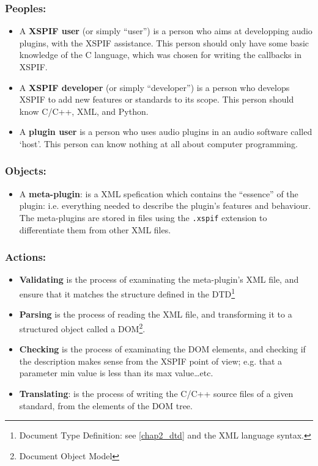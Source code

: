 \subsubsection{Peoples:}
\begin{itemize}
\item{A \textbf{XSPIF user}} (or simply ``user'') is a person who aims
  at developping audio plugins, with the XSPIF assistance. This person
  should only have some basic knowledge of the C language, which was
  chosen for writing the callbacks in XSPIF. 

\item{A \textbf{XSPIF developer}} (or simply ``developer'') is a
  person who develops XSPIF to add new features or standards to its
  scope. This person should know C/C++, XML, and Python. 

\item{A \textbf{plugin user}} is a person who uses audio plugins in an
  audio software called `host'. This person can know nothing at all
  about computer programming. 
\end{itemize}

\subsubsection{Objects:}
\begin{itemize}
\item{A \textbf{meta-plugin}}: is a XML spefication which contains the
  ``essence'' of the plugin: i.e. everything needed to describe the
  plugin's features and behaviour. The meta-plugins are stored in files
  using the \verb|.xspif| extension to differentiate them from other
  XML files.
\end{itemize}

\subsubsection{Actions:}
\begin{itemize}
\item{\textbf{Validating}} is the process of examinating the
  meta-plugin's XML file, and ensure that it matches the structure
  defined in the DTD\footnote{Document Type Definition: see
  \ref{chap2_dtd} and the XML language syntax.} 
\item\textbf{{Parsing}} is the process of reading the XML file, and
  transforming it to a structured object called a DOM\footnote{Document Object Model}.
\item{\textbf{Checking}} is the process of examinating the DOM
  elements, and checking if the description makes sense from the XSPIF
  point of view; e.g. that a parameter min value is less than its max
  value\ldots etc. 
\item{\textbf{Translating}}: is the process of writing the C/C++ source files of a given standard, from the elements of the DOM tree.
\end{itemize}


